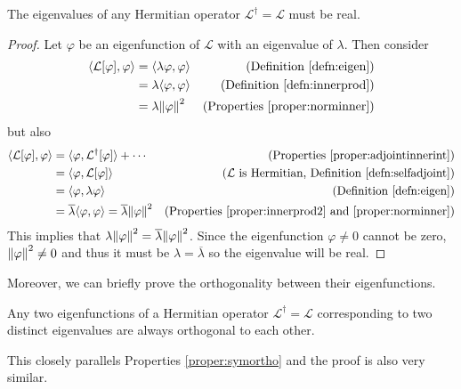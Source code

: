 \begin{proper}
\label{proper:hermrealeiginner}
The eigenvalues of any Hermitian operator $\mathcal{L}^\dag = \mathcal{L}$ must be real.
\end{proper}
\begin{proof}
Let $\varphi$ be an eigenfunction of $\mathcal{L}$ with an eigenvalue of $\lambda$. Then consider
\begin{align*}
\langle \mathcal{L}[\varphi], \varphi \rangle &= \langle \lambda \varphi, \varphi \rangle & \text{(Definition \ref{defn:eigen})} \\
&= \lambda \langle \varphi, \varphi \rangle & \text{(Definition \ref{defn:innerprod})} \\
&= \lambda \norm{\varphi}^2 & \text{(Properties \ref{proper:norminner})}
\end{align*}
but also
\begin{align*}
\langle \mathcal{L}[\varphi], \varphi \rangle &= \langle \varphi, \mathcal{L}^\dag[\varphi] \rangle + \cdots & \text{(Properties \ref{proper:adjointinnerint})} \\
&= \langle \varphi, \mathcal{L}[\varphi] \rangle & \text{($\mathcal{L}$ is Hermitian, Definition \ref{defn:selfadjoint})} \\
&= \langle \varphi, \lambda \varphi \rangle & \text{(Definition \ref{defn:eigen})} \\
&= \overline{\lambda} \langle \varphi, \varphi \rangle = \overline{\lambda} \norm{\varphi}^2 & \text{(Properties \ref{proper:innerprod2} and  \ref{proper:norminner})} 
\end{align*}
This implies that $\lambda \norm{\varphi}^2 = \overline{\lambda} \norm{\varphi}^2$. Since the eigenfunction $\varphi \neq 0$ cannot be zero, $\norm{\varphi}^2 \neq 0$ and thus it must be $\lambda = \overline{\lambda}$ so the eigenvalue will be real.
\end{proof}
Moreover, we can briefly prove the orthogonality between their eigenfunctions.
\begin{proper}
\label{proper:orthogonalherm}
Any two eigenfunctions of a Hermitian operator $\mathcal{L}^\dag = \mathcal{L}$ corresponding to two distinct eigenvalues are always orthogonal to each other.
\end{proper}
This closely parallels Properties \ref{proper:symortho} and the proof is also very similar.

